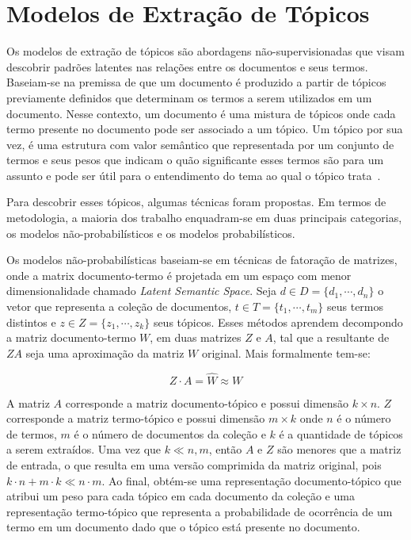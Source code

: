 
\section{Modelos de Extração de Tópicos}

Os modelos de extração de tópicos são abordagens não-supervisionadas que visam descobrir padrões latentes nas relações entre os documentos e seus termos.  Baseiam-se na premissa de que um documento é produzido a partir de tópicos previamente definidos que determinam os termos a serem utilizados em um documento. Nesse contexto, um documento é uma mistura de tópicos onde cada termo presente no documento pode ser associado a um tópico. Um tópico por sua vez, é uma estrutura com valor semântico que representada por um conjunto de termos e seus pesos que indicam o quão significante esses termos são para um assunto e pode ser útil para o entendimento do tema ao qual o tópico trata~\cite{Steyvers2007,Blei2012}.

Para descobrir esses tópicos, algumas técnicas foram propostas. Em termos de metodologia, a maioria dos trabalho enquadram-se em duas principais categorias, os modelos não-probabilísticos e os modelos probabilísticos.



Os modelos não-probabilísticas baseiam-se em técnicas de fatoração de matrizes, onde a matrix documento-termo é projetada em um espaço com menor dimensionalidade chamado \textit{Latent Semantic Space}. 
Seja
$d \in D = \{d_1,\cdots,d_n\}$ o vetor que representa a coleção de documentos, 
$t \in T = \{t_1,\cdots,t_m\}$ seus termos distintos e 
$z \in Z = \{z_1,\cdots,z_k\}$ seus tópicos. 
Esses métodos aprendem decompondo a matriz documento-termo $W$, em duas matrizes $Z$ e $A$, tal que a resultante de $ZA$ seja uma aproximação da matriz $W$ original. Mais formalmente tem-se:

\begin{equation}
	Z\cdot A = \hat{W} \approx W
\end{equation}

A matriz $A$ corresponde a matriz documento-tópico e possui dimensão $k \times n$. $Z$ corresponde a matriz termo-tópico e possui dimensão $m \times k$ onde $n$ é o número de termos, $m$ é o número de documentos da coleção e $k$ é a quantidade de tópicos a serem extraídos. Uma vez que $k \ll n,m$, então $A$ e $Z$ são menores que a matriz de entrada, o que resulta em uma versão comprimida da matriz original, pois $k \cdot n + m \cdot k \ll n \cdot m$. Ao final, obtém-se uma representação documento-tópico que atribui um peso para cada tópico em cada documento da coleção e uma representação termo-tópico que representa a probabilidade de ocorrência de um termo em um documento dado que o tópico está presente no documento.

